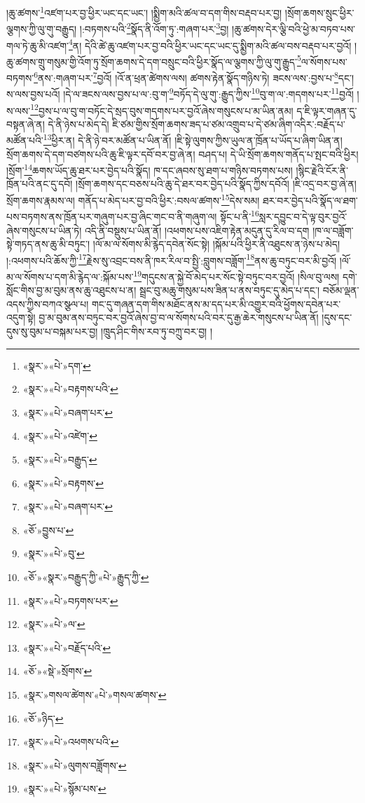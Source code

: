 །ཆུ་ཚགས་\footnote{«སྣར་»«པེ་»དག་}འཛག་པར་བྱ་ཕྱིར་ཡང་དང་ཡང་། །སྨྱིག་མའི་ཚལ་བ་དག་གིས་བརྡབ་པར་བྱ། །སྲོག་ཆགས་སྲུང་ཕྱིར་ལྕགས་ཀྱི་ལུ་གུ་བརྒྱུད། །:བཏགས་པའི་\footnote{«སྣར་»«པེ་»བརྟགས་པའི་}སྣོད་ནི་འོག་ཏུ་:གཞག་པར་\footnote{«སྣར་»«པེ་»བཞག་པར་}བྱ། །ཆུ་ཚགས་དེར་ལྕི་བའི་ཕྱེ་མ་བཏབ་པས་གལ་ཏེ་ཆུ་མི་འཛག་\footnote{«སྣར་»«པེ་»འཛེག་}ན། དེའི་ཚེ་ཆུ་འཛག་པར་བྱ་བའི་ཕྱིར་ཡང་དང་ཡང་དུ་སྨྱིག་མའི་ཚལ་བས་བརྡབ་པར་བྱའོ། །ཆུ་ཚགས་གྲུ་གསུམ་གྱི་འོག་ཏུ་སྲོག་ཆགས་དེ་དག་བསྲུང་བའི་ཕྱིར་སྣོད་ལ་ལྕགས་ཀྱི་ལུ་གུ་རྒྱུད་\footnote{«སྣར་»«པེ་»བརྒྱུད་}ལ་སོགས་པས་བཏགས་\footnote{«སྣར་»«པེ་»བརྟགས་}ནས་:གཞག་པར་\footnote{«སྣར་»«པེ་»བཞག་པར་}བྱའོ། །འོ་ན་ཕྲན་ཚེགས་ལས། ཚགས་རྟེན་སྣོད་གཉིས་ཏེ། ཟངས་ལས་:བྱས་པ་\footnote{«ཅོ་»བྱུས་པ་}དང་། ས་ལས་བྱས་པའོ། །དེ་ལ་ཟངས་ལས་བྱས་པ་ལ་:བུ་ག་\footnote{«སྣར་»«པེ་»བུ་}བཏོད་དེ་ལུ་གུ་:རྒྱུད་ཀྱིས་\footnote{«ཅོ་»«སྣར་»བརྒྱུད་ཀྱི་«པེ་»རྒྱུད་ཀྱི་}བུ་ག་ལ་:གདགས་པར་\footnote{«སྣར་»«པེ་»བཏགས་པར་}བྱའོ། །ས་ལས་\footnote{«སྣར་»«པེ་»ལ་}བྱས་པ་ལ་བུ་ག་བཏོང་དེ་སྲད་བུས་གདགས་པར་བྱའོ་ཞེས་གསུངས་པ་མ་ཡིན་ནམ། ད་ཇི་ལྟར་གཞན་དུ་བསྟན་ཞེ་ན། དེ་ནི་ཉེས་པ་མེད་དེ། ཇི་ཙམ་གྱིས་སྲོག་ཆགས་ཟད་པ་ཙམ་འགྲུབ་པ་དེ་ཙམ་ཞིག་འདིར་:བརྗོད་པ་མཚོན་པའི་\footnote{«སྣར་»«པེ་»བརྗོད་པའི་}ཕྱིར་ན། དེ་ནི་ཉེ་བར་མཚོན་པ་ཡིན་ནོ། །ཇི་སྟེ་ལུགས་ཀྱིས་ཡུལ་ན་ཁྲོན་པ་ཡོད་པ་ཞིག་ཡིན་ན། སྲོག་ཆགས་དེ་དག་བཙགས་པའི་ཆུ་ཇི་ལྟར་དབོ་བར་བྱ་ཞེ་ན། བཤད་པ། དེ་ཡི་སྲོག་ཆགས་གནོད་པ་སྤང་བའི་ཕྱིར། །སྲོག་\footnote{«ཅོ་»«སྡེ་»སྲོགས་}ཆགས་ཡོད་ཆུ་ཐར་པར་བྱེད་པའི་སྣོད། ཁ་དང་ཞབས་སུ་ཐག་པ་གཉིས་བཏགས་པས། །སྙིང་རྗེའི་ངོར་ནི་ཁྲོན་པའི་ནང་དུ་དབོ། །སྲོག་ཆགས་དང་བཅས་པའི་ཆུ་དེ་ཐར་བར་བྱེད་པའི་སྣོད་ཀྱིས་དབོའོ། །ཇི་འདྲ་བར་བྱ་ཞེ་ན། སྲོག་ཆགས་རྣམས་ལ། གནོད་པ་མེད་པར་བྱ་བའི་ཕྱིར་:བསལ་ཚགས་\footnote{«སྣར་»གསལ་ཚེགས་«པེ་»གསལ་ཚགས་}དེས་སམ། ཐར་བར་བྱེད་པའི་སྣོད་ལ་ཐག་པས་བཏགས་ནས་ཁྲོན་པར་གཞུག་པར་བྱ་ཞིང་གང་བ་ནི་གཞུག་ལ། སྟོང་པ་ནི་\footnote{«ཅོ་»ཉིད་}སླར་དབྱུང་བ་དེ་ལྟ་བུར་བྱའོ་ཞེས་གསུངས་པ་ཡིན་ཏེ། འདི་ནི་བསྡུས་པ་ཡིན་ནོ། །འཕགས་པས་འཇིག་རྟེན་མདུན་དུ་རིལ་བ་དག །ཁ་ལ་བཟློག་སྟེ་གཏད་ནས་ཆུ་མི་བཏུང་། །ལོ་མ་ལ་སོགས་མི་རྙེད་དབེན་སོང་སྟེ། །སྐོམ་པའི་ཕྱིར་ནི་འཐུངས་ན་ཉེས་པ་མེད། །:འཕགས་པའི་ཆོས་ཀྱི་\footnote{«སྣར་»«པེ་»འཕགས་པའི་}རྗེས་སུ་འབྲང་བས་ནི་ཁར་རིལ་བ་སྤྱི་:བླུགས་བཟློག་\footnote{«སྣར་»«པེ་»ལུགས་བཟློགས་}ནས་ཆུ་བཏུང་བར་མི་བྱའོ། །ལོ་མ་ལ་སོགས་པ་དག་མི་རྙེད་ལ་:སྐོམ་པས་\footnote{«སྣར་»«པེ་»སྙོམ་པས་}གདུངས་ན་སྐྱེ་བོ་མེད་པར་སོང་སྟེ་བཏུང་བར་བྱའོ། །སིལ་བུ་ལས། དགེ་སློང་གིས་བྱ་མ་བུམ་ནས་ཆུ་འཐུངས་པ་ན། སྦྲང་བུ་མཆུ་གསུམ་པས་ཟིན་པ་ནས་བཏུང་དུ་མེད་པ་དང་། བཅོམ་ལྡན་འདས་ཀྱིས་བཀའ་སྩལ་པ། གང་དུ་གཞན་དག་གིས་མཐོང་ནས་མ་དད་པར་མི་འགྱུར་བའི་ཕྱོགས་དབེན་པར་འདུག་སྟེ། བྱ་མ་བུམ་ནས་བཏུང་བར་བྱའོ་ཞེས་བྱ་བ་ལ་སོགས་པའི་བར་དུ་རྒྱ་ཆེར་གསུངས་པ་ཡིན་ནོ། །དུས་དང་དུས་སུ་བུམ་པ་བསྐམ་པར་བྱ། །ཁྲུད་ཤིང་གིས་རབ་ཏུ་བཀྲུ་བར་བྱ། །
